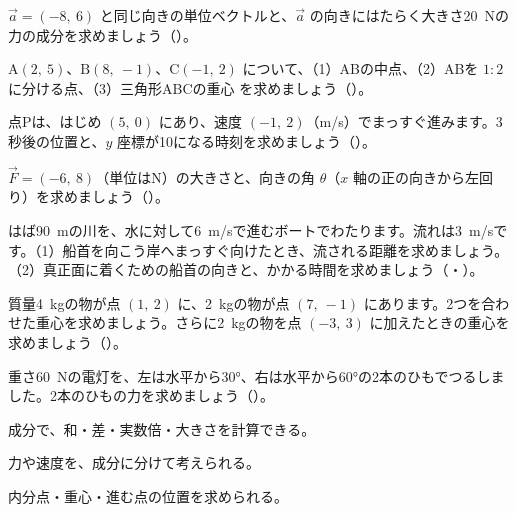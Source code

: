 \bkproblem $\vec{a}=(-8,\ 6)$ と同じ向きの単位ベクトルと、$\vec{a}$ の向きにはたらく大きさ\qty{20}{N}の力の成分を求めましょう（）。

\bkproblem $\mathrm{A}(2,\ 5)$、$\mathrm{B}(8,\ -1)$、$\mathrm{C}(-1,\ 2)$ について、（1）ABの中点、（2）ABを $1:2$ に分ける点、（3）三角形ABCの重心 を求めましょう（）。

\bkproblem 点Pは、はじめ $(5,\ 0)$ にあり、速度 $(-1,\ 2)$（m/s）でまっすぐ進みます。3秒後の位置と、$y$ 座標が10になる時刻を求めましょう（）。


\bkproblem $\vec{F}=(-6,\ 8)$（単位はN）の大きさと、向きの角 $\theta$（$x$ 軸の正の向きから左回り）を求めましょう（）。

\bkproblem はば\qty{90}{m}の川を、水に対して\qty{6}{m/s}で進むボートでわたります。流れは\qty{3}{m/s}です。（1）船首を向こう岸へまっすぐ向けたとき、流される距離を求めましょう。（2）真正面に着くための船首の向きと、かかる時間を求めましょう（・）。

\bkproblem 質量\qty{4}{kg}の物が点 $(1,\ 2)$ に、\qty{2}{kg}の物が点 $(7,\ -1)$ にあります。2つを合わせた重心を求めましょう。さらに\qty{2}{kg}の物を点 $(-3,\ 3)$ に加えたときの重心を求めましょう（）。

\bkproblem 重さ\qty{60}{N}の電灯を、左は水平から30°、右は水平から60°の2本のひもでつるしました。2本のひもの力を求めましょう（）。

\begin{furikaeri}
\begin{checklist}
\item 成分で、和・差・実数倍・大きさを計算できる。
\item 力や速度を、成分に分けて考えられる。
\item 内分点・重心・進む点の位置を求められる。
\end{checklist}
\end{furikaeri}

